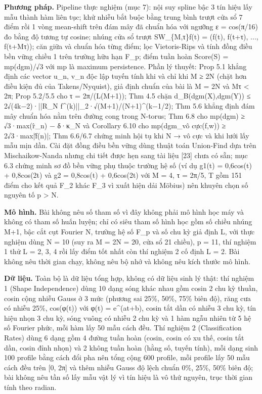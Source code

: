 \documentclass[12pt,a4paper]{article}
\begin{document}
\noindent \textbf{Phương pháp.} Pipeline thực nghiệm (mục 7): nội suy spline bậc 3 tín hiệu lấy mẫu thành hàm liên tục; khử nhiễu bắt buộc bằng trung bình trượt cửa sổ 7 điểm rồi 1 vòng mean-shift trên đám mây đã chuẩn hóa với ngưỡng ε = cos(π/16) đo bằng độ tương tự cosine; nhúng cửa sổ trượt SW\_\{M,τ\}f(t) = (f(t), f(t+τ), ..., f(t+Mτ)); căn giữa và chuẩn hóa từng điểm; lọc Vietoris-Rips và tính đồng điều bền vững chiều 1 trên trường hữu hạn F\_p; điểm tuần hoàn Score(S) = mp(dgm)/√3 với mp là maximum persistence. Phần lý thuyết: Prop 5.1 khẳng định các vector u\_n, v\_n độc lập tuyến tính khi và chỉ khi M ≥ 2N (chặt hơn điều kiện đủ của Takens/Nyquist), giả định chuẩn của bài là M = 2N và Mτ < 2π; Prop 5.2/5.5 cho τ = 2π/(L(M+1)); Thm 4.5 chặn d\_B(dgm(X),dgm(Y)) ≤ 2√(4k−2)·||R\_N f\textasciicircum{}(k)||\_2·√(M+1)/(N+1)\textasciicircum{}(k−1/2); Thm 5.6 khẳng định đám mây chuẩn hóa nằm trên đường cong trong N-torus; Thm 6.8 cho mp(dgm) ≥ √3·max(r̂\_n) − δ·κ\_N và Corollary 6.10 cho mp(dgm\_vô cực(f,w)) ≥ 2√3·max|f̂(n)|; Thm 6.6/6.7 chứng minh hội tụ khi N → vô cực và khi lưới lấy mẫu mịn dần. Cài đặt đồng điều bền vững dùng thuật toán Union-Find dựa trên Mischaikow-Nanda nhưng chi tiết được hẹn sang tài liệu [23] chưa có sẵn; mục 6.3 chứng minh sơ đồ bền vững phụ thuộc trường hệ số (ví dụ g1(t) = 0,6cos(t) + 0,8cos(2t) và g2 = 0,8cos(t) + 0,6cos(2t) với M = 4, τ = 2π/5, T gồm 151 điểm cho kết quả F\_2 khác F\_3 vì xuất hiện dải Möbius) nên khuyên chọn số nguyên tố p > N.\par\vspace{3pt}
\noindent \textbf{Mô hình.} Bài không nêu số tham số vì đây không phải mô hình học máy và không có tham số huấn luyện; chỉ có siêu tham số hình học gồm số chiều nhúng M+1, bậc cắt cụt Fourier N, trường hệ số F\_p và số chu kỳ giả định L, với thực nghiệm dùng N = 10 (suy ra M = 2N = 20, cửa sổ 21 chiều), p = 11, thí nghiệm 1 thử L = 2, 3, 4 rồi lấy điểm tốt nhất còn thí nghiệm 2 cố định L = 2. Bài không nêu thời gian chạy, không nêu bộ nhớ và không nêu kích thước mô hình.\par\vspace{3pt}
\noindent \textbf{Dữ liệu.} Toàn bộ là dữ liệu tổng hợp, không có dữ liệu sinh lý thật: thí nghiệm 1 (Shape Independence) dùng 10 dạng sóng khác nhau gồm cosin 2 chu kỳ thuần, cosin cộng nhiễu Gauss ở 3 mức (phương sai 25\%, 50\%, 75\% biên độ), răng cưa có nhiễu 25\%, cos(φ(t)) với φ(t) = e\textasciicircum{}(at+b), cosin tắt dần có nhiễu 3 chu kỳ, tín hiệu nhọn 3 chu kỳ, sóng vuông có nhiễu 2 chu kỳ và 1 hàm ngẫu nhiên từ 5 hệ số Fourier phức, mỗi hàm lấy 50 mẫu cách đều. Thí nghiệm 2 (Classification Rates) dùng 6 dạng gồm 4 đường tuần hoàn (cosin, cosin có xu thế, cosin tắt dần, cosin đỉnh nhọn) và 2 không tuần hoàn (hằng số, tuyến tính), mỗi dạng sinh 100 profile bằng cách đổi pha nên tổng cộng 600 profile, mỗi profile lấy 50 mẫu cách đều trên [0, 2π] và thêm nhiễu Gauss độ lệch chuẩn 0\%, 25\%, 50\% biên độ; bài không nêu tần số lấy mẫu vật lý vì tín hiệu là vô thứ nguyên, trục thời gian tính theo radian.\par\vspace{3pt}
\end{document}
